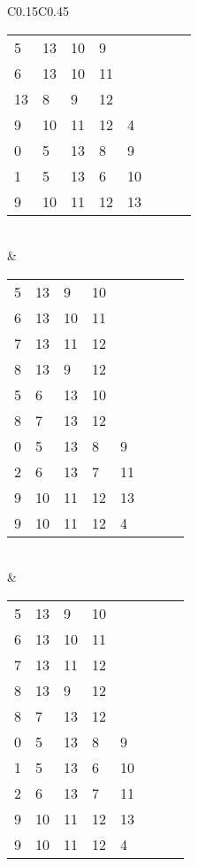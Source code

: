 \begin{longtable}{C{0.15\textwidth}C{0.45\textwidth}}
\begin{tabular}{p{}p{}p{}p{}p{}p{}p{}p{}}
5 & 13 & 10 & 9 &  &  &  & \\
6 & 13 & 10 & 11 &  &  &  & \\
13 & 8 & 9 & 12 &  &  &  & \\
9 & 10 & 11 & 12 & 4 &  &  & \\
0 & 5 & 13 & 8 & 9 &  &  & \\
1 & 5 & 13 & 6 & 10 &  &  & \\
9 & 10 & 11 & 12 & 13 &  &  & \\
\end{tabular}
\\ & 
\begin{tabular}{p{}p{}p{}p{}p{}p{}p{}p{}}
5 & 13 & 9 & 10 &  &  &  & \\
6 & 13 & 10 & 11 &  &  &  & \\
7 & 13 & 11 & 12 &  &  &  & \\
8 & 13 & 9 & 12 &  &  &  & \\
5 & 6 & 13 & 10 &  &  &  & \\
8 & 7 & 13 & 12 &  &  &  & \\
0 & 5 & 13 & 8 & 9 &  &  & \\
2 & 6 & 13 & 7 & 11 &  &  & \\
9 & 10 & 11 & 12 & 13 &  &  & \\
9 & 10 & 11 & 12 & 4 &  &  & \\
\end{tabular}
\\ & 
\begin{tabular}{p{}p{}p{}p{}p{}p{}p{}p{}}
5 & 13 & 9 & 10 &  &  &  & \\
6 & 13 & 10 & 11 &  &  &  & \\
7 & 13 & 11 & 12 &  &  &  & \\
8 & 13 & 9 & 12 &  &  &  & \\
8 & 7 & 13 & 12 &  &  &  & \\
0 & 5 & 13 & 8 & 9 &  &  & \\
1 & 5 & 13 & 6 & 10 &  &  & \\
2 & 6 & 13 & 7 & 11 &  &  & \\
9 & 10 & 11 & 12 & 13 &  &  & \\
9 & 10 & 11 & 12 & 4 &  &  & \\
\end{tabular}
\\\hline

\end{longtable}
